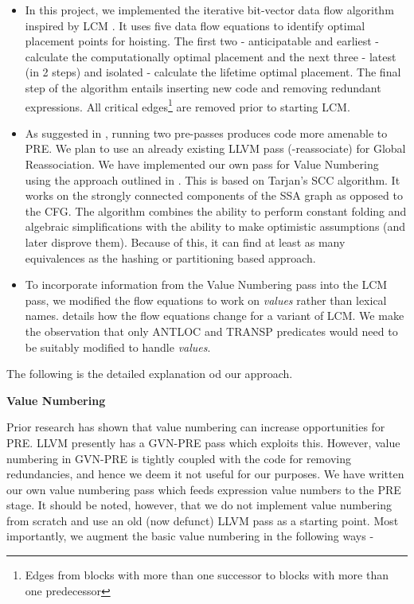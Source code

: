 \documentclass[10pt,twoside]{report}
\begin{document}
\begin{itemize}
\item  In this project, we implemented the iterative bit-vector
data flow algorithm inspired by LCM \cite{Knoop}. It uses five data flow equations to
identify optimal placement points for hoisting. The first two - anticipatable
and earliest - calculate the computationally optimal placement and the next
three - latest (in 2 steps) and isolated - calculate the lifetime optimal
placement.  The final step of the algorithm entails inserting new code and
removing redundant expressions. All critical edges\footnote{Edges from blocks
  with more than one successor to blocks with more than one predecessor } are
  removed prior to starting LCM.

\item As suggested in \cite{Briggs2}, running two pre-passes produces code more
amenable to PRE. We plan to use an already existing LLVM pass (-reassociate)
  for Global Reassociation.  We have implemented our own pass for Value Numbering
  using the approach outlined in \cite{Cooper95scc-basedvalue}. This is based
  on Tarjan's SCC algorithm. It works on the strongly connected components of
  the SSA graph as opposed to the CFG. The algorithm combines the ability to
  perform constant folding and algebraic simplifications with the ability to
  make optimistic assumptions (and later disprove them). Because of this, it
  can find at least as many equivalences as the hashing or partitioning based
  approach.

\item To incorporate information from the Value Numbering pass into the LCM pass,
  we modified the flow equations to work on \emph{values} rather than
  lexical names. \cite{CVDC} details how the flow equations
  change for a variant of LCM. We make the observation that only ANTLOC and
  TRANSP predicates would need to be suitably modified to handle \emph{values}.
\end{itemize}

The following is the detailed explanation od our approach.

\begin{flushleft}
\textbf{\large{Value Numbering}}
\end{flushleft}

Prior research has shown that value numbering can increase opportunities for PRE.
LLVM presently has a GVN-PRE pass which exploits this. However, value numbering in 
GVN-PRE is tightly coupled with the code for removing redundancies, and hence
we deem it not useful for our purposes. We have written our own value numbering
pass which feeds expression value numbers to the PRE stage. It should be noted,
     however, that we do not implement value numbering from scratch and use an
     old (now defunct) LLVM pass as a starting point. Most importantly, we
     augment the basic value numbering in the following ways - 
     
\end{document}
